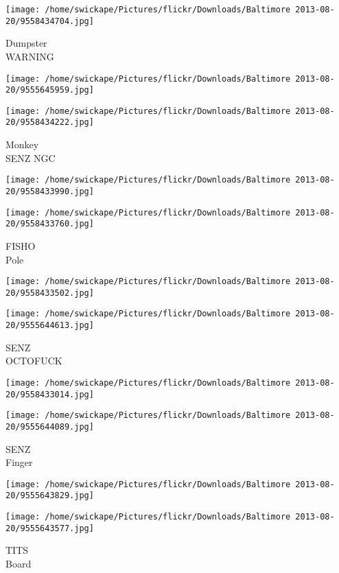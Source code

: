 \documentclass[10pt,letterpaper]{article}
\begin{document}
\vspace{0.25in}
\texttt{[image: /home/swickape/Pictures/flickr/Downloads/Baltimore 2013-08-20/9558434704.jpg]}

Dumpster\\
WARNING
\pagebreak

\texttt{[image: /home/swickape/Pictures/flickr/Downloads/Baltimore 2013-08-20/9555645959.jpg]}

\vspace{0.25in}
\texttt{[image: /home/swickape/Pictures/flickr/Downloads/Baltimore 2013-08-20/9558434222.jpg]}

Monkey\\
SENZ NGC
\pagebreak

\texttt{[image: /home/swickape/Pictures/flickr/Downloads/Baltimore 2013-08-20/9558433990.jpg]}

\vspace{0.25in}
\texttt{[image: /home/swickape/Pictures/flickr/Downloads/Baltimore 2013-08-20/9558433760.jpg]}

FISHO\\
Pole
\pagebreak

\texttt{[image: /home/swickape/Pictures/flickr/Downloads/Baltimore 2013-08-20/9558433502.jpg]}

\vspace{0.25in}
\texttt{[image: /home/swickape/Pictures/flickr/Downloads/Baltimore 2013-08-20/9555644613.jpg]}

SENZ\\
OCTOFUCK
\pagebreak

\texttt{[image: /home/swickape/Pictures/flickr/Downloads/Baltimore 2013-08-20/9558433014.jpg]}

\vspace{0.25in}
\texttt{[image: /home/swickape/Pictures/flickr/Downloads/Baltimore 2013-08-20/9555644089.jpg]}

SENZ\\
Finger
\pagebreak

\texttt{[image: /home/swickape/Pictures/flickr/Downloads/Baltimore 2013-08-20/9555643829.jpg]}

\vspace{0.25in}
\texttt{[image: /home/swickape/Pictures/flickr/Downloads/Baltimore 2013-08-20/9555643577.jpg]}

TITS\\
Board
\pagebreak
\end{document}
